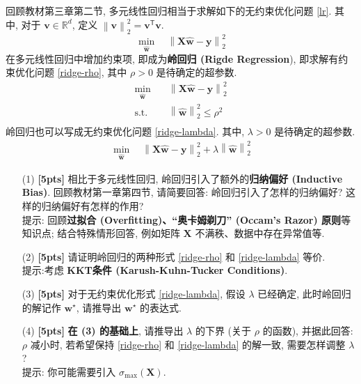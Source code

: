 \documentclass[a4paper]{article}
\numberwithin{equation}{section}
\theoremstyle{definition}
\def \transposed {\mathsf{T}}
\def \Real {\mathbb{R}}
\def \X {\mathbf{X}}
\def \v {\bm{v}}
\def \wh {\hat{\bm{w}}}
\def \ws {\bm{w}^\star}
\def \y {\bm{y}}
\newcommand\norm[1]{\left\| #1 \right\|}
\begin{document}
回顾教材第三章第二节, 多元线性回归相当于求解如下的无约束优化问题 \eqref{lr}. 其中, 对于 $\v \in \Real^d$, 定义 $\norm{\v}_2^2 = \v^\transposed \v$.
\begin{equation}
    \min_{\wh} \quad\norm{\X\wh - \y}_2^2
    \label{lr}
\end{equation}
在多元线性回归中增加约束项, 即成为\textbf{岭回归 (Rigde Regression}), 即求解有约束优化问题 \eqref{ridge-rho}, 其中 $\rho > 0$ 是待确定的超参数.
\begin{equation}
    \begin{aligned}
        \min_{\wh} \quad  & \norm{\X\wh - \y}_2^2           \\
        \text{s.t.} \quad & \norm{\wh}_2^2 \leqslant \rho^2 \\
    \end{aligned}
    \label{ridge-rho}
\end{equation}
岭回归也可以写成无约束优化问题 \eqref{ridge-lambda}. 其中, $\lambda > 0$ 是待确定的超参数.
\begin{equation}
    \begin{aligned}
        \min_{\wh} \quad\norm{\X\wh - \y}_2^2 + \lambda \norm{\wh}_2^2
    \end{aligned}
    \label{ridge-lambda}
\end{equation}

\begin{itemize}
    \item[(1)] \textbf{[5pts]} 相比于多元线性回归, 岭回归引入了额外的\textbf{归纳偏好 (Inductive Bias)}. 回顾教材第一章第四节, 请简要回答: 岭回归引入了怎样的归纳偏好? 这样的归纳偏好有怎样的作用? \\
          提示: 回顾\textbf{过拟合 (Overfitting)、``奥卡姆剃刀'' (Occam's Razor) 原则}等知识点; 结合特殊情形回答, 例如矩阵 $\X$ 不满秩、数据中存在异常值等.
    \item[(2)] \textbf{[5pts]} 请证明岭回归的两种形式 \eqref{ridge-rho} 和 \eqref{ridge-lambda} 等价. \\
          提示:考虑 \textbf{KKT条件 (Karush-Kuhn-Tucker Conditions)}.
    \item[(3)] \textbf{[5pts]} 对于无约束优化形式 \eqref{ridge-lambda}, 假设 $\lambda$ 已经确定, 此时岭回归的解记作 $\ws$, 请推导出 $\ws$ 的表达式.
    \item[(4)] \textbf{[5pts]} \textbf{在 (3) 的基础上}, 请推导出 $\lambda$ 的下界 (关于 $\rho$ 的函数), 并据此回答: $\rho$ 减小时, 若希望保持 \eqref{ridge-rho} 和 \eqref{ridge-lambda} 的解一致, 需要怎样调整 $\lambda$? \\
          提示: 你可能需要引入 $\sigma_{\max}(\X)$.
\end{itemize}
\end{document}
